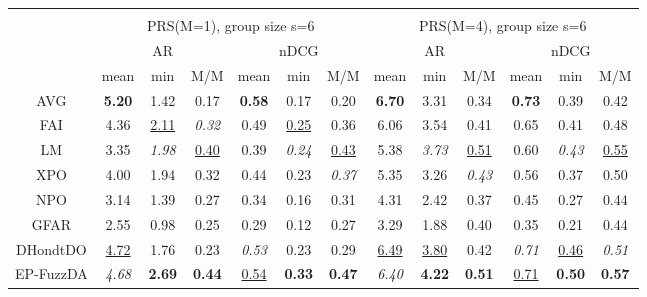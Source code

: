 \begin{tabular}{ c | c c c | c c c || c c c | c c c}
\multicolumn{12}{c}{} \\
\multicolumn{1}{c}{} & \multicolumn{6}{c}{PRS(M=1), group size s=6} & \multicolumn{6}{c}{PRS(M=4), group size s=6} \\
\multicolumn{1}{c}{} & \multicolumn{3}{c}{AR} & \multicolumn{3}{c}{nDCG} & \multicolumn{3}{c}{AR} & \multicolumn{3}{c}{nDCG} \\
& mean & min & M/M & mean & min & M/M & mean & min & M/M & mean & min & M/M \\
\hline
AVG & \textbf{5.20} & 1.42 & 0.17 & \textbf{0.58} & 0.17 & 0.20 & \textbf{6.70} & 3.31 & 0.34 & \textbf{0.73} & 0.39 & 0.42 \\
FAI & 4.36 & \underline{2.11} & \textit{0.32} & 0.49 & \underline{0.25} & 0.36 & 6.06 & 3.54 & 0.41 & 0.65 & 0.41 & 0.48 \\
LM & 3.35 & \textit{1.98} & \underline{0.40} & 0.39 & \textit{0.24} & \underline{0.43} & 5.38 & \textit{3.73} & \underline{0.51} & 0.60 & \textit{0.43} & \underline{0.55} \\
XPO & 4.00 & 1.94 & 0.32 & 0.44 & 0.23 & \textit{0.37} & 5.35 & 3.26 & \textit{0.43} & 0.56 & 0.37 & 0.50 \\
NPO & 3.14 & 1.39 & 0.27 & 0.34 & 0.16 & 0.31 & 4.31 & 2.42 & 0.37 & 0.45 & 0.27 & 0.44 \\
GFAR & 2.55 & 0.98 & 0.25 & 0.29 & 0.12 & 0.27 & 3.29 & 1.88 & 0.40 & 0.35 & 0.21 & 0.44 \\
DHondtDO & \underline{4.72} & 1.76 & 0.23 & \textit{0.53} & 0.23 & 0.29 & \underline{6.49} & \underline{3.80} & 0.42 & \textit{0.71} & \underline{0.46} & \textit{0.51} \\
EP-FuzzDA & \textit{4.68} & \textbf{2.69} & \textbf{0.44} & \underline{0.54} & \textbf{0.33} & \textbf{0.47} & \textit{6.40} & \textbf{4.22} & \textbf{0.51} & \underline{0.71} & \textbf{0.50} & \textbf{0.57} \\


\end{tabular}
